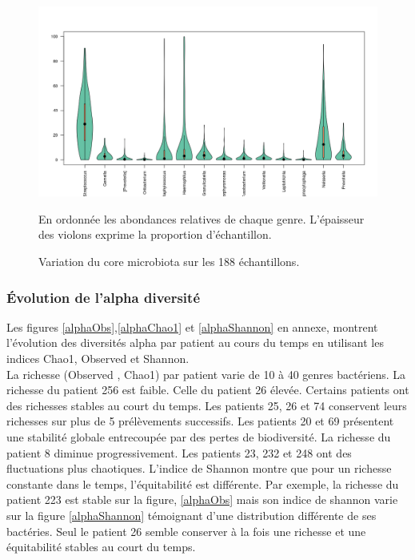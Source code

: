 \documentclass[12pt,a4paper]{article}
\begin{document}
\begin{figure}
\begin{center}
\includegraphics[scale=0.6]{img/variability.png}\hfill
\end{center}
\caption{Variation du core microbiota sur les 188 échantillons.}
En ordonnée les abondances relatives de chaque genre. L’épaisseur des violons exprime la proportion d'échantillon.
\label{violon}
\end{figure}

\subsubsection{Évolution de l'alpha diversité}
Les figures \ref{alphaObs},\ref{alphaChao1} et \ref{alphaShannon} en annexe, montrent l’évolution des diversités alpha par patient au cours du temps en utilisant les indices Chao1, Observed et Shannon. \\
La richesse (Observed , Chao1) par patient varie de 10 à 40 genres bactériens. La richesse du patient 256 est faible. Celle du patient 26 élevée.
Certains patients ont des richesses stables au court du temps. Les patients 25, 26 et 74 conservent leurs richesses sur plus de 5 prélèvements successifs. Les patients 20 et 69 présentent une stabilité globale entrecoupée par des pertes de biodiversité. La richesse du patient 8 diminue progressivement. Les patients 23, 232 et 248 ont des fluctuations plus chaotiques.
L'indice de Shannon montre que pour un richesse constante dans le temps, l'équitabilité est différente. Par exemple, la richesse du patient 223 est stable sur la figure, \ref{alphaObs} mais son indice de shannon varie sur la figure \ref{alphaShannon} témoignant d'une distribution différente de ses bactéries. Seul le patient 26 semble conserver à la fois une richesse et une équitabilité stables au court du temps.
\end{document}

